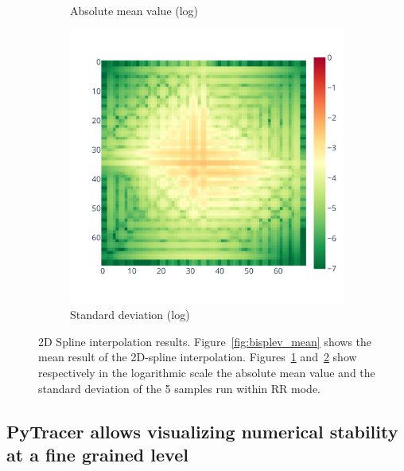 \documentclass[10pt,journal,compsoc]{IEEEtran}
\newcommand{\pytracer}[0]{PyTracer\xspace}
\begin{document}
\begin{figure}
\begin{subfigure}{.3\linewidth}
        \caption{Absolute mean value (log)}
        \label{fig:bisplev_mean_log}
    \end{subfigure}
    \begin{subfigure}{.3\linewidth}
        \centering
        \includegraphics[width=\linewidth]{figure/spline_2d/bisplev_std_log.pdf}
        \caption{Standard deviation (log)}
        \label{fig:bisplev_std_log}
    \end{subfigure}
    \caption{2D Spline interpolation results. Figure~\ref{fig:bisplev_mean}
        shows the mean result of the 2D-spline interpolation.
        Figures~\ref{fig:bisplev_mean_log} and~\ref{fig:bisplev_std_log} show
        respectively in the logarithmic scale the absolute mean value and the
        standard deviation of the 5 samples run within RR mode. 
    }
    \label{fig:spline2d_rr}
\end{figure}

\subsection{\pytracer allows visualizing numerical stability at a fine grained level}
\end{document}
